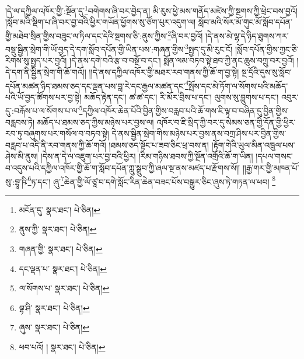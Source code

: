 །དེ་ལ་དཀྱིལ་འཁོར་གྱི་:སྔོན་དུ་\footnote{མངོན་དུ་  སྣར་ཐང་།  པེ་ཅིན། }བགེགས་ཞི་བར་བྱེད་ན། མི་རུས་ཕྱེ་མས་གནོད་མཛེས་ཀྱི་སྔགས་ཀྱི་ཕྲེང་བས་བྱའོ། །སློབ་མའི་སྡིག་པ་ཞི་བར་བྱ་བའི་ཕྱིར་གཡོན་ཕྱོགས་སུ་ཙོག་པུར་འདུག་ལ། སློབ་མའི་སོར་མོ་གུང་མོ་སློབ་དཔོན་གྱི་མཐེབ་སྲིན་གྱིས་བཟུང་ལ་ཏིལ་དང་དེའི་སྔགས་ཅི་:ནུས་ཀྱིས་\footnote{ནུས་ཀྱི་  སྣར་ཐང་།  པེ་ཅིན། }ཞི་བར་བྱའོ། །དེ་ནས་མེ་ལྷ་དེ་ཉིད་ཐུགས་ཀར་བསྡུ་སྦྱིན་སྲེག་གི་ཡོ་བྱད་དེ་དག་སློབ་དཔོན་གྱི་ཡིན་པས་:གཞན་གྱིས་\footnote{གཞན་གྱི་  སྣར་ཐང་།  པེ་ཅིན། }སྤྱད་དུ་མི་རུང་ངོ། །སློབ་དཔོན་གྱིས་ཀྱང་ཅི་རིགས་སུ་སྤྱད་པར་བྱའོ། །དེ་ནས་དགེ་བའི་རྩ་བ་བསྔོ་བ་དང་། སྨོན་ལམ་བཏབ་སྟེ་ཐབ་ཀྱི་ནང་ཆུས་བཀྲུ་བར་བྱའོ། །དེ་དག་ནི་སྦྱིན་སྲེག་གི་ཆོ་གའོ།། །།དེ་ནས་དཀྱིལ་འཁོར་གྱི་མཐར་རབ་གནས་ཀྱི་ཆོ་ག་བྱ་སྟེ། སྔ་དྲོའི་དུས་སུ་སློབ་དཔོན་མཚན་ཉིད་ཐམས་ཅད་དང་ལྡན་པས་བླ་རེ་དང་རྒྱལ་མཚན་དང་\footnote{དང་ལྡན་པ་  སྣར་ཐང་།  པེ་ཅིན། }སྤོས་དང་མེ་ཏོག་ལ་སོགས་པའི་མཆོད་པའི་ཡོ་བྱད་ཚོགས་པར་བྱ་སྟེ། མཆོད་རྟེན་དང་། ཚ་ཚ་དང་། རི་མོར་བྲིས་པ་དང་། ལུགས་སུ་བླུགས་པ་དང་། འབུར་དུ་:བརྐོས་པ་ལ་སོགས་པ་ལ་\footnote{ལ་སོགས་པ་  སྣར་ཐང་།  པེ་ཅིན། }དཀྱིལ་འཁོར་ཆེན་པོའི་བྱིན་གྱིས་བརླབ་པའི་ཆོ་གས་ཇི་ལྟ་བ་བཞིན་དུ་བྱིན་གྱིས་བརླབས་ཏེ། མཆོད་པ་ཐམས་ཅད་ཀྱིས་མཉེས་པར་བྱས་ལ། འཁོར་བ་ཇི་སྲིད་ཀྱི་བར་དུ་སེམས་ཅན་གྱི་དོན་གྱི་ཕྱིར་རབ་ཏུ་བཞུགས་པར་གསོལ་བ་བཏབ་སྟེ། དེ་ནས་སྦྱིན་སྲེག་གིས་མཉེས་པར་བྱས་ནས་བཀྲ་ཤིས་པར་བྱིན་གྱིས་བརླབ་པ་འདི་ནི་རབ་གནས་ཀྱི་ཆོ་གའོ། །ཐམས་ཅད་སྟོང་པ་ཟབ་ཅིང་ཕྲ་བས་ན། །རྟོག་གེའི་ཡུལ་མིན་འཁྲུལ་པས་ཤེས་མི་ནུས། །དེས་ན་དེ་ལ་འཇུག་པར་བྱ་བའི་ཕྱིར། །རིམ་གཉིས་ཐབས་ཀྱི་སྔོན་འགྲོའི་ཆོ་ག་ཡིན། །དཔལ་གསང་བ་འདུས་པའི་དཀྱིལ་འཁོར་གྱི་ཆོ་ག་སློབ་དཔོན་ཀླུ་སྒྲུབ་ཀྱི་ཞལ་སྔ་ནས་མཛད་པ་རྫོགས་སོ།། །།རྒྱ་གར་གྱི་མཁན་པོ་སུ་:བྷཱ་ཥི་\footnote{བྷ་ཤི་  སྣར་ཐང་།  པེ་ཅིན། }ཏ་དང་། ཞུ་\footnote{ཞུས་  སྣར་ཐང་།  པེ་ཅིན། }ཆེན་གྱི་ལོ་ཙཱ་བ་དགེ་སློང་རིན་ཆེན་བཟང་པོས་བསྒྱུར་ཅིང་ཞུས་ཏེ་གཏན་ལ་ཕབ། \footnote{ཕབ་པའོ། །   སྣར་ཐང་།  པེ་ཅིན། }